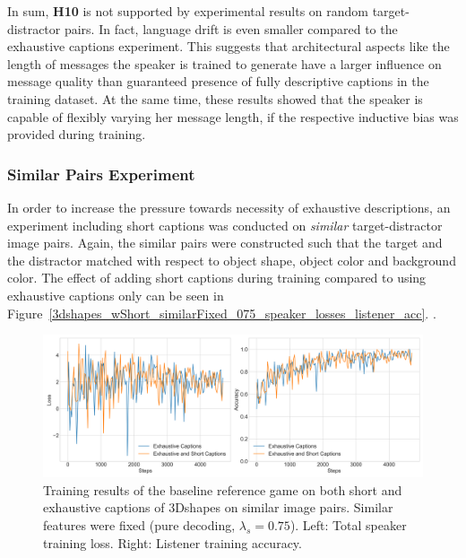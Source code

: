 In sum, \textbf{H10} is not supported by experimental results on random target-distractor pairs. In fact, language drift is even smaller compared to the exhaustive captions experiment. This suggests that architectural aspects like the length of messages the speaker is trained to generate have a larger influence on message quality than guaranteed presence of fully descriptive captions in the training dataset. At the same time, these results showed that the speaker is capable of flexibly varying her message length, if the respective inductive bias was provided during training. 

\subsubsection{Similar Pairs Experiment}
\label{expt:3d_similar}

In order to increase the pressure towards necessity of exhaustive descriptions, an experiment including short captions was conducted on \emph{similar} target-distractor image pairs. Again, the similar pairs were constructed such that the target and the distractor matched with respect to object shape, object color and background color. The effect of adding short captions during training compared to using exhaustive captions only can be seen in Figure~\ref{3dshapes_wShort_similarFixed_075_speaker_losses_listener_acc}. .

\begin{figure}
	\centering
	\includegraphics[width=\linewidth]{images/3dshapes_similarFixed_short_vs_exh_075_losses.png}
	\caption{Training results of the baseline reference game on both short and exhaustive captions of 3Dshapes on similar image pairs. Similar features were fixed (pure decoding, $\lambda_s=0.75$). Left: Total speaker training loss. Right: Listener training accuracy.}
	\label{fig:3dshapes_wShort_similarFixed_075_speaker_losses_listener_acc}
\end{figure}


